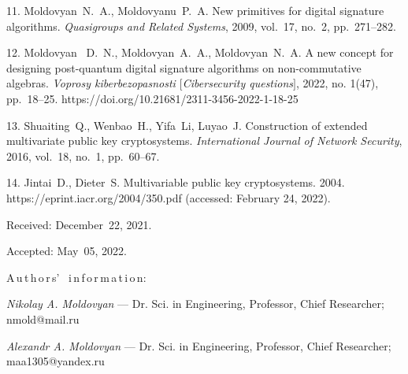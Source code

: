 {11. Moldovyan~N.~A., Moldovyanu~P.~A. New primitives for digital signature algorithms. {\it  Quasigroups and Related Systems}, 2009, vol.~17, no.~2, pp.~271--282. 

12. Moldovyan~ D.~N., Moldovyan~A.~A., Moldovyan~N.~A. A new concept for designing post-quantum digital signature algorithms on non-commutative algebras. {\it  Voprosy kiberbezopasnosti $[$Cibersecurity questions$]$}, 2022, no. 1(47), pp.~18--25. https://doi.org/10.21681/2311-3456-2022-1-18-25 

13. Shuaiting~Q., Wenbao~H., Yifa~Li,  Luyao~J. Construction of extended multivariate public key cryptosystems.  {\it  International Journal of Network Security}, 2016, vol.~18, no.~1, pp.~60--67.

14. Jintai~D., Dieter~S. Multivariable public key cryptosystems. 2004.\\
https://eprint.iacr.org/2004/350.pdf (accessed: February  24, 2022).


\vskip 1.5mm

%


Received:  December~22, 2021.

Accepted: May~05, 2022.

\vskip 6mm


A\,u\,t\,h\,o\,r\,s' \ i\,n\,f\,o\,r\,m\,a\,t\,i\,o\,n:


\vskip 2mm
 \textit{Nikolay A. Moldovyan} --- Dr. Sci. in Engineering, Professor, Chief Researcher; nmold@mail.ru \par


\vskip 2mm
 \textit{Alexandr A. Moldovyan} --- Dr. Sci. in Engineering, Professor, Chief Researcher; maa1305@yandex.ru 
 \par
%
%
}
